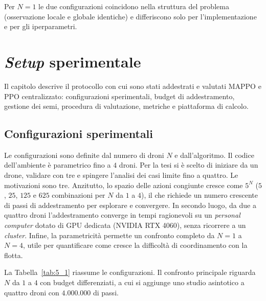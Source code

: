 \documentclass[12pt,a4paper,twoside]{report}
\begin{document}
Per $N = 1$ le due configurazioni coincidono nella struttura del problema (osservazione locale e globale identiche) e differiscono solo per l'implementazione e per gli iperparametri.

\chapter{\emph{Setup} sperimentale}
\label{chap:setup}

Il capitolo descrive il protocollo con cui sono stati addestrati e valutati MAPPO e PPO centralizzato: configurazioni sperimentali, budget di addestramento, gestione dei semi, procedura di valutazione, metriche e piattaforma di calcolo.

\section{Configurazioni sperimentali}
\label{sec:configurazioni_sperimentali}

Le configurazioni sono definite dal numero di droni $N$ e dall'algoritmo. Il codice dell'ambiente è parametrico fino a $4$ droni. Per la tesi si è scelto di iniziare da un drone, validare con tre e spingere l'analisi dei casi limite fino a quattro. Le motivazioni sono tre. Anzitutto, lo spazio delle azioni congiunte cresce come $5^N$ ($5$, $25$, $125$ e $625$ combinazioni per $N$ da $1$ a $4$), il che richiede un numero crescente di passi di addestramento per esplorare e convergere. In secondo luogo, da due a quattro droni l'addestramento converge in tempi ragionevoli su un \emph{personal computer} dotato di GPU dedicata (NVIDIA RTX 4060), senza ricorrere a un \emph{cluster}. Infine, la parametricità permette un confronto completo da $N = 1$ a $N = 4$, utile per quantificare come cresce la difficoltà di coordinamento con la flotta.

La Tabella~\ref{tab:5_1} riassume le configurazioni. Il confronto principale riguarda $N$ da $1$ a $4$ con budget differenziati, a cui si aggiunge uno studio asintotico a quattro droni con $4.000.000$ di passi.
\end{document}
